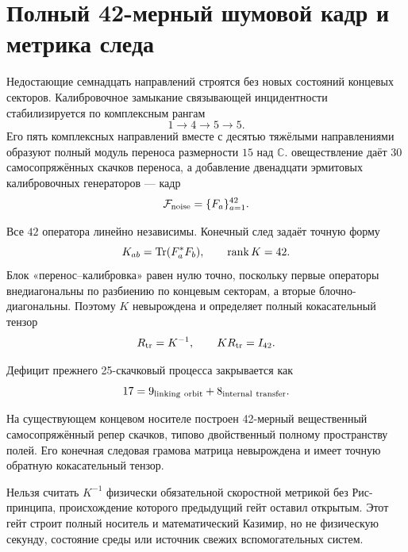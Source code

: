 \chapter{Полный 42-мерный шумовой кадр и метрика следа}
\label{ch:v8-full-noise-trace-frame-metric-gate}

Недостающие семнадцать направлений строятся без новых состояний концевых секторов.
Калибровочное замыкание связывающей инцидентности стабилизируется по комплексным рангам
\begin{equation}
 1\longrightarrow4\longrightarrow5\longrightarrow5.
\end{equation}
Его пять комплексных направлений вместе с десятью тяжёлыми направлениями
образуют полный модуль переноса размерности $15$ над $\mathbb C$.
овеществление даёт $30$ самосопряжённых скачков переноса, а добавление
двенадцати эрмитовых калибровочных генераторов --- кадр
\begin{equation}
 \mathcal F_{\rm noise}=\{F_a\}_{a=1}^{42}.
\end{equation}

Все $42$ оператора линейно независимы. Конечный след задаёт точную форму
\begin{equation}
 K_{ab}=\operatorname{Tr}(F_a^*F_b),
 \qquad \operatorname{rank} K=42.
\end{equation}
Блок «перенос--калибровка» равен нулю точно, поскольку первые операторы
внедиагональны по разбиению по концевым секторам, а вторые блочно-диагональны. Поэтому
$K$ невырождена и определяет полный кокасательный тензор
\begin{equation}
 R_{\rm tr}=K^{-1},\qquad KR_{\rm tr}=I_{42}.
\end{equation}

Дефицит прежнего 25-скачковый процесса закрывается как
\begin{equation}
 17=9_{\rm linking\ orbit}+8_{\rm internal\ transfer}.
\end{equation}

\begin{theorem}
На существующем концевом носителе построен 42-мерный вещественный
самосопряжённый репер скачков, типово двойственный полному пространству полей.
Его конечная следовая грамова матрица невырождена и имеет точную обратную
кокасательный тензор.
\end{theorem}

\begin{nogocriterion}
Нельзя считать $K^{-1}$ физически обязательной скоростной метрикой без Рис-
принципа, происхождение которого предыдущий гейт оставил открытым. Этот
гейт строит полный носитель и математический Казимир, но не физическую
секунду, состояние среды или источник свежих вспомогательных систем.
\end{nogocriterion}

